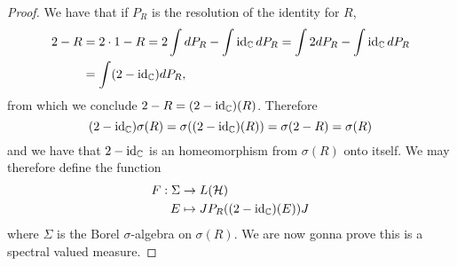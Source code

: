 \begin{proof}
We have that if $P_R$ is the resolution of the identity for $R$,
\begin{align}
\begin{split}
2-R&=2\cdot1-R=2\int dP_R - \int \operatorname{id}_\mathbb{C}dP_R=\int 2 dP_R - \int \operatorname{id}_\mathbb{C}dP_R \\
&=\int (2-\operatorname{id}_\mathbb{C}) dP_R, 
\end{split}
\end{align}
from which we conclude $2-R=(2-\operatorname{id}_\mathbb{C})(R)$.
Therefore 
\begin{equation}
(2-\operatorname{id}_\mathbb{C})\sigma(R)=\sigma((2-\operatorname{id}_\mathbb{C})(R))=\sigma(2-R)=\sigma(R)
\end{equation}
and we have that $2-\operatorname{id}_\mathbb{C}$ is an homeomorphism from $\sigma(R)$ onto itself. We may therefore define the function
\begin{align}
\begin{split}
F:\Sigma&\rightarrow L(\mathcal{H}) \\
E&\mapsto JP_R((2-\operatorname{id}_\mathbb{C})(E))J
\end{split}
\end{align}
where $\Sigma$ is the Borel $\sigma$-algebra on $\sigma(R)$. We are now gonna prove this is a spectral valued measure.


\end{proof}
